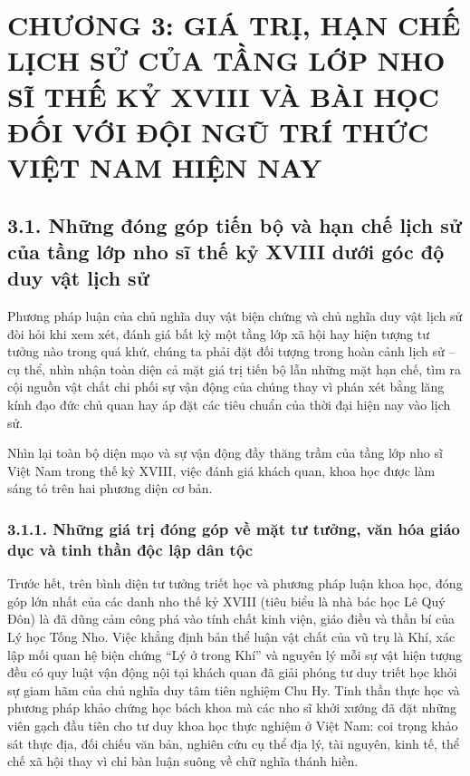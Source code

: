 \section*{CHƯƠNG 3: GIÁ TRỊ, HẠN CHẾ LỊCH SỬ CỦA TẦNG LỚP NHO SĨ THẾ KỶ XVIII VÀ BÀI HỌC ĐỐI VỚI ĐỘI NGŨ TRÍ THỨC VIỆT NAM HIỆN NAY}

\subsection*{3.1. Những đóng góp tiến bộ và hạn chế lịch sử của tầng lớp nho sĩ thế kỷ XVIII dưới góc độ duy vật lịch sử}

Phương pháp luận của chủ nghĩa duy vật biện chứng và chủ nghĩa duy vật lịch sử đòi hỏi khi xem xét, đánh giá bất kỳ một tầng lớp xã hội hay hiện tượng tư tưởng nào trong quá khứ, chúng ta phải đặt đối tượng trong hoàn cảnh lịch sử -- cụ thể, nhìn nhận toàn diện cả mặt giá trị tiến bộ lẫn những mặt hạn chế, tìm ra cội nguồn vật chất chi phối sự vận động của chúng thay vì phán xét bằng lăng kính đạo đức chủ quan hay áp đặt các tiêu chuẩn của thời đại hiện nay vào lịch sử.

Nhìn lại toàn bộ diện mạo và sự vận động đầy thăng trầm của tầng lớp nho sĩ Việt Nam trong thế kỷ XVIII, việc đánh giá khách quan, khoa học được làm sáng tỏ trên hai phương diện cơ bản.

\subsubsection*{3.1.1. Những giá trị đóng góp về mặt tư tưởng, văn hóa giáo dục và tinh thần độc lập dân tộc}

Trước hết, trên bình diện tư tưởng triết học và phương pháp luận khoa học, đóng góp lớn nhất của các danh nho thế kỷ XVIII (tiêu biểu là nhà bác học Lê Quý Đôn) là đã dũng cảm công phá vào tính chất kinh viện, giáo điều và thần bí của Lý học Tống Nho. Việc khẳng định bản thể luận vật chất của vũ trụ là Khí, xác lập mối quan hệ biện chứng ``Lý ở trong Khí'' và nguyên lý mỗi sự vật hiện tượng đều có quy luật vận động nội tại khách quan đã giải phóng tư duy triết học khỏi sự giam hãm của chủ nghĩa duy tâm tiên nghiệm Chu Hy. Tinh thần thực học và phương pháp khảo chứng học bách khoa mà các nho sĩ khởi xướng đã đặt những viên gạch đầu tiên cho tư duy khoa học thực nghiệm ở Việt Nam: coi trọng khảo sát thực địa, đối chiếu văn bản, nghiên cứu cụ thể địa lý, tài nguyên, kinh tế, thể chế xã hội thay vì chỉ bàn luận suông về chữ nghĩa thánh hiền.

